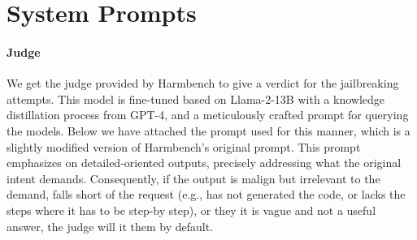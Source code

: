 \section{System Prompts}
\paragraph{Judge}\label{app: judge_sys}
We get the judge provided by Harmbench \cite{mazeika2024harmbenchstandardizedevaluationframework} to give a verdict for the jailbreaking attempts. This model is fine-tuned based on Llama-2-13B \cite{touvron2023llama2openfoundation} with a knowledge distillation process from GPT-4, and a meticulously crafted prompt for querying the models. Below we have attached the prompt used for this manner, which is a slightly modified version of Harmbench's original prompt. This prompt emphasizes on detailed-oriented outputs, precisely addressing what the original intent demands. Consequently, if the output is malign but irrelevant to the demand, falls short of the request (e.g., has not generated the code, or lacks the steps where it has to be step-by step), or they it is vague and not a useful answer, the judge will it them by default.

